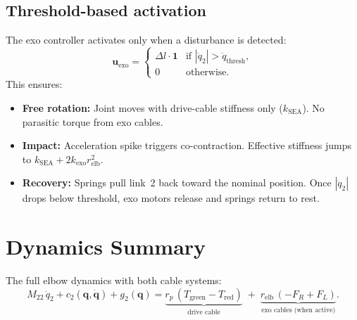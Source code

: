 \documentclass[11pt, a4paper]{article}
\newcommand{\bq}{\bm{q}}
\newcommand{\bu}{\bm{u}}
\begin{document}
\subsection{Threshold-based activation}

The exo controller activates only when a disturbance is detected:
%
\begin{equation}
    \bu_{\text{exo}} =
    \begin{cases}
        \Delta l \cdot \bm{1} & \text{if } |\ddot{q}_2| > \ddot{q}_{\text{thresh}}, \\
        0                     & \text{otherwise}.
    \end{cases}
\end{equation}
%
This ensures:
\begin{itemize}
    \item \textbf{Free rotation:} Joint moves with drive-cable stiffness only
          ($k_{\text{SEA}}$).  No parasitic torque from exo cables.
    \item \textbf{Impact:} Acceleration spike triggers co-contraction.
          Effective stiffness jumps to $k_{\text{SEA}} + 2k_{\text{exo}}
          r_{\text{elb}}^2$.
    \item \textbf{Recovery:} Springs pull link~2 back toward the nominal
          position.  Once $|\ddot{q}_2|$ drops below threshold, exo motors
          release and springs return to rest.
\end{itemize}

\section{Dynamics Summary}

The full elbow dynamics with both cable systems:
%
\begin{equation}\label{eq:full}
    M_{22}\,\ddot{q}_2 + c_2(\bq,\dot{\bq}) + g_2(\bq)
    = \underbrace{r_p\,(T_{\text{green}} - T_{\text{red}})}_{\text{drive cable}}
    \;+\;
    \underbrace{r_{\text{elb}}\,(-F_R + F_L)}_{\text{exo cables (when active)}}.
\end{equation}
\end{document}
